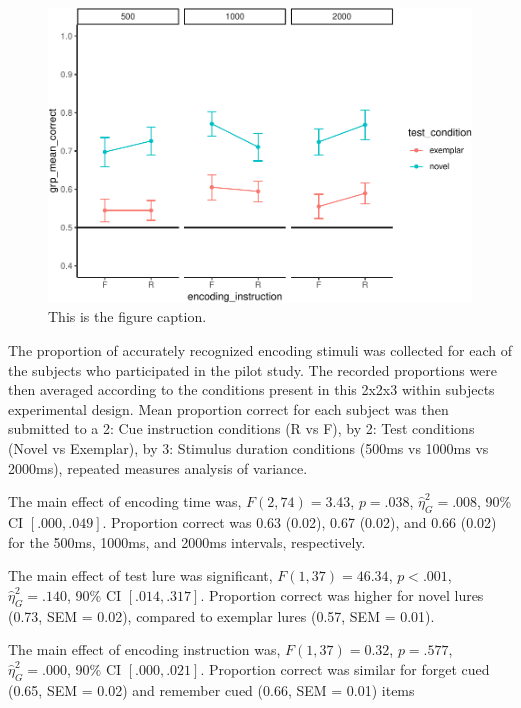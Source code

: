 \documentclass[
  man,floatsintext]{apa6}
\begin{document}
\begin{figure}
\centering
\includegraphics{honorsThesis_files/figure-latex/e1fig-1.pdf}
\caption{\label{fig:e1fig}This is the figure caption.}
\end{figure}

The proportion of accurately recognized encoding stimuli was collected for each of the subjects who participated in the pilot study. The recorded proportions were then averaged according to the conditions present in this 2x2x3 within subjects experimental design. Mean proportion correct for each subject was then submitted to a 2: Cue instruction conditions (R vs F), by 2: Test conditions (Novel vs Exemplar), by 3: Stimulus duration conditions (500ms vs 1000ms vs 2000ms), repeated measures analysis of variance.

The main effect of encoding time was, \(F(2, 74) = 3.43\), \(p = .038\), \(\hat{\eta}^2_G = .008\), 90\% CI \([.000, .049]\). Proportion correct was 0.63 (0.02), 0.67 (0.02), and 0.66 (0.02) for the 500ms, 1000ms, and 2000ms intervals, respectively.

The main effect of test lure was significant, \(F(1, 37) = 46.34\), \(p < .001\), \(\hat{\eta}^2_G = .140\), 90\% CI \([.014, .317]\). Proportion correct was higher for novel lures (0.73, SEM = 0.02), compared to exemplar lures (0.57, SEM = 0.01).

The main effect of encoding instruction was, \(F(1, 37) = 0.32\), \(p = .577\), \(\hat{\eta}^2_G = .000\), 90\% CI \([.000, .021]\). Proportion correct was similar for forget cued (0.65, SEM = 0.02) and remember cued (0.66, SEM = 0.01) items
\end{document}
